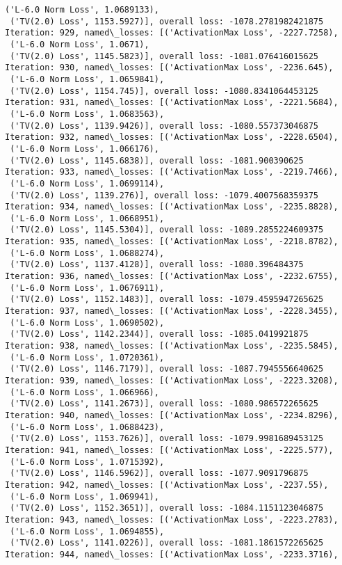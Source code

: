 \documentclass[10pt]{article}
\begin{document}
\begin{Verbatim}[commandchars=\\\{\}]
 ('L-6.0 Norm Loss', 1.0689133),
 ('TV(2.0) Loss', 1153.5927)], overall loss: -1078.2781982421875
Iteration: 929, named\_losses: [('ActivationMax Loss', -2227.7258),
 ('L-6.0 Norm Loss', 1.0671),
 ('TV(2.0) Loss', 1145.5823)], overall loss: -1081.076416015625
Iteration: 930, named\_losses: [('ActivationMax Loss', -2236.645),
 ('L-6.0 Norm Loss', 1.0659841),
 ('TV(2.0) Loss', 1154.745)], overall loss: -1080.8341064453125
Iteration: 931, named\_losses: [('ActivationMax Loss', -2221.5684),
 ('L-6.0 Norm Loss', 1.0683563),
 ('TV(2.0) Loss', 1139.9426)], overall loss: -1080.557373046875
Iteration: 932, named\_losses: [('ActivationMax Loss', -2228.6504),
 ('L-6.0 Norm Loss', 1.066176),
 ('TV(2.0) Loss', 1145.6838)], overall loss: -1081.900390625
Iteration: 933, named\_losses: [('ActivationMax Loss', -2219.7466),
 ('L-6.0 Norm Loss', 1.0699114),
 ('TV(2.0) Loss', 1139.276)], overall loss: -1079.4007568359375
Iteration: 934, named\_losses: [('ActivationMax Loss', -2235.8828),
 ('L-6.0 Norm Loss', 1.0668951),
 ('TV(2.0) Loss', 1145.5304)], overall loss: -1089.2855224609375
Iteration: 935, named\_losses: [('ActivationMax Loss', -2218.8782),
 ('L-6.0 Norm Loss', 1.0688274),
 ('TV(2.0) Loss', 1137.4128)], overall loss: -1080.396484375
Iteration: 936, named\_losses: [('ActivationMax Loss', -2232.6755),
 ('L-6.0 Norm Loss', 1.0676911),
 ('TV(2.0) Loss', 1152.1483)], overall loss: -1079.4595947265625
Iteration: 937, named\_losses: [('ActivationMax Loss', -2228.3455),
 ('L-6.0 Norm Loss', 1.0690502),
 ('TV(2.0) Loss', 1142.2344)], overall loss: -1085.0419921875
Iteration: 938, named\_losses: [('ActivationMax Loss', -2235.5845),
 ('L-6.0 Norm Loss', 1.0720361),
 ('TV(2.0) Loss', 1146.7179)], overall loss: -1087.7945556640625
Iteration: 939, named\_losses: [('ActivationMax Loss', -2223.3208),
 ('L-6.0 Norm Loss', 1.066966),
 ('TV(2.0) Loss', 1141.2673)], overall loss: -1080.986572265625
Iteration: 940, named\_losses: [('ActivationMax Loss', -2234.8296),
 ('L-6.0 Norm Loss', 1.0688423),
 ('TV(2.0) Loss', 1153.7626)], overall loss: -1079.9981689453125
Iteration: 941, named\_losses: [('ActivationMax Loss', -2225.577),
 ('L-6.0 Norm Loss', 1.0715392),
 ('TV(2.0) Loss', 1146.5962)], overall loss: -1077.9091796875
Iteration: 942, named\_losses: [('ActivationMax Loss', -2237.55),
 ('L-6.0 Norm Loss', 1.069941),
 ('TV(2.0) Loss', 1152.3651)], overall loss: -1084.1151123046875
Iteration: 943, named\_losses: [('ActivationMax Loss', -2223.2783),
 ('L-6.0 Norm Loss', 1.0694855),
 ('TV(2.0) Loss', 1141.0226)], overall loss: -1081.1861572265625
Iteration: 944, named\_losses: [('ActivationMax Loss', -2233.3716),

\end{Verbatim}
\end{document}

